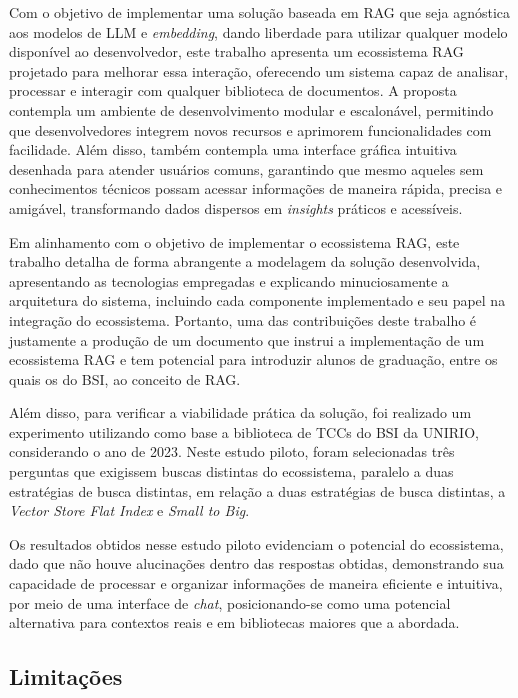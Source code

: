 \documentclass[a4paper, 12pt]{article}
\begin{document}
    Com o objetivo de implementar uma solução baseada em RAG que seja agnóstica aos modelos de LLM e \textit{embedding}, dando liberdade para utilizar qualquer modelo disponível ao desenvolvedor, este trabalho apresenta um ecossistema RAG projetado para melhorar essa interação, oferecendo um sistema capaz de analisar, processar e interagir com qualquer biblioteca de documentos. A proposta contempla um ambiente de desenvolvimento modular e escalonável, permitindo que desenvolvedores integrem novos recursos e aprimorem funcionalidades com facilidade. Além disso, também contempla uma interface gráfica intuitiva desenhada para atender usuários comuns, garantindo que mesmo aqueles sem conhecimentos técnicos possam acessar informações de maneira rápida, precisa e amigável, transformando dados dispersos em \textit{insights} práticos e acessíveis. 

    Em alinhamento com o objetivo de implementar o ecossistema RAG, este trabalho detalha de forma abrangente a modelagem da solução desenvolvida, apresentando as tecnologias empregadas e explicando minuciosamente a arquitetura do sistema, incluindo cada componente implementado e seu papel na integração do ecossistema. Portanto, uma das contribuições deste trabalho é justamente a produção de um documento que instrui a implementação de um ecossistema RAG e tem potencial para introduzir alunos de graduação, entre os quais os do BSI, ao conceito de RAG.
    
    Além disso, para verificar a viabilidade prática da solução, foi realizado um experimento utilizando como base a biblioteca de TCCs do BSI da UNIRIO, considerando o ano de 2023. Neste estudo piloto, foram selecionadas três perguntas que exigissem buscas distintas do ecossistema, paralelo a duas estratégias de busca distintas, em relação a duas estratégias de busca distintas, a \textit{Vector Store Flat Index} e \textit{Small to Big}.
    
    Os resultados obtidos nesse estudo piloto evidenciam o potencial do ecossistema, dado que não houve alucinações dentro das respostas obtidas, demonstrando sua capacidade de processar e organizar informações de maneira eficiente e intuitiva, por meio de uma interface de \textit{chat}, posicionando-se como uma potencial alternativa para contextos reais e em bibliotecas maiores que a abordada.

    \subsection{Limitações}
\end{document}
